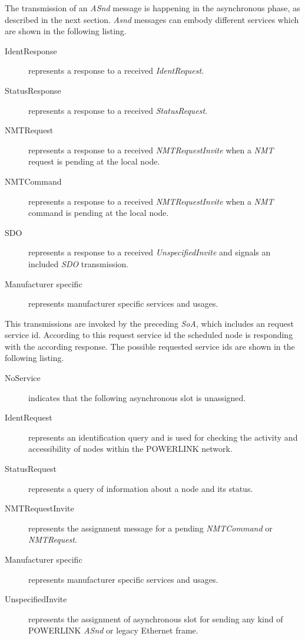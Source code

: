 The transmission of an \emph{ASnd} message is happening in the asynchronous phase, as described in the next section.
\emph{Asnd} messages can embody different services which are shown in the following listing.\cite[section 4.6.1.1.6.1]{epsg_epsg_2013}

\begin{description}
    \item[IdentResponse] represents a response to a received \emph{IdentRequest}.
    \item[StatusResponse] represents a response to a received \emph{StatusRequest}.
    \item[NMTRequest] represents a response to a received \emph{NMTRequestInvite} when a \emph{NMT} request is pending at the local node.
    \item[NMTCommand] represents a response to a received \emph{NMTRequestInvite} when a \emph{NMT} command is pending at the local node.
    \item[SDO] represents a response to a received \emph{UnspecifiedInvite} and signals an included \emph{SDO} transmission.
    \item[Manufacturer specific] represents manufacturer specific services and usages.
\end{description}

This transmissions are invoked by the preceding \emph{SoA}, which includes an request service id.
According to this request service id the scheduled node is responding with the according response.
The possible requested service ids are shown in the following listing. \cite[section 4.6.1.1.5.1]{epsg_epsg_2013}

\begin{description}
    \item[NoService] indicates that the following asynchronous slot is unassigned.
    \item[IdentRequest] represents an identification query and is used for checking the activity and accessibility of nodes within the POWERLINK network.
    \item[StatusRequest] represents a query of information about a node and its status.
    \item[NMTRequestInvite] represents the assignment message for a pending \emph{NMTCommand} or \emph{NMTRequest}.
    \item[Manufacturer specific] represents manufacturer specific services and usages.
    \item[UnspecifiedInvite] represents the assignment of asynchronous slot for sending any kind of POWERLINK \emph{ASnd} or legacy Ethernet frame.
\end{description}

